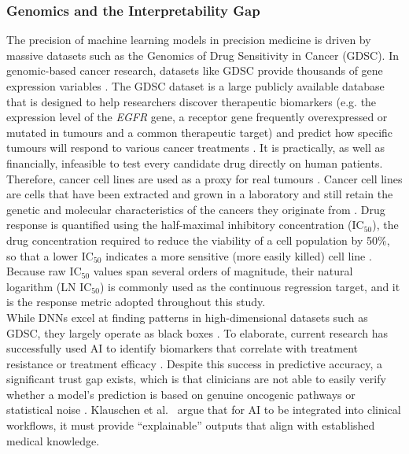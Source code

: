 \subsubsection{Genomics and the Interpretability Gap}
\label{ssub:genomics-interpretability}
The precision of machine learning models in precision medicine is driven by massive datasets such as
the Genomics of Drug Sensitivity in Cancer (GDSC). In genomic-based cancer research, datasets like
GDSC provide thousands of gene expression variables \cite{Baptista2021,Yang2013}. The GDSC dataset is
a large publicly available database that is designed to help researchers discover therapeutic biomarkers (e.g. the expression level of the \textit{EGFR} gene, a receptor gene
frequently overexpressed or mutated in tumours and a common therapeutic target) and predict how
specific tumours will respond
to various cancer treatments \cite{Yang2013}. It is practically, as well as financially, infeasible to
test every candidate drug directly on human patients. Therefore, cancer cell lines are used as a proxy
for real tumours \cite{Yang2013}. Cancer cell lines are cells that have been extracted and grown in a
laboratory and still retain the genetic and molecular characteristics of the cancers they originate
from \cite{Yang2013}. Drug response is quantified using the half-maximal inhibitory concentration
(IC$_{50}$), the drug concentration required to reduce the viability of a cell population by 50\%, so
that a lower IC$_{50}$ indicates a more sensitive (more easily killed) cell line \cite{Yang2013}.
Because raw IC$_{50}$ values span several orders of magnitude, their natural logarithm (LN IC$_{50}$)
is commonly used as the continuous regression target, and it is the response metric adopted throughout
this study.
\\
While DNNs excel at finding patterns in high-dimensional datasets such as GDSC, they largely operate
as black boxes \cite{Partin2023,Klauschen2024}. To elaborate, current research has successfully used
AI to identify biomarkers that correlate with treatment resistance or treatment efficacy
\cite{Partin2023,Klauschen2024,Baptista2021}. Despite this success in predictive accuracy, a
significant trust gap exists, which is that clinicians are not able to easily verify whether a model's
prediction is based on genuine oncogenic pathways or statistical noise \cite{Klauschen2024}. Klauschen
et al.~\cite{Klauschen2024} argue that for AI to be integrated into clinical workflows, it must
provide ``explainable'' outputs that align with established medical knowledge.
\\
